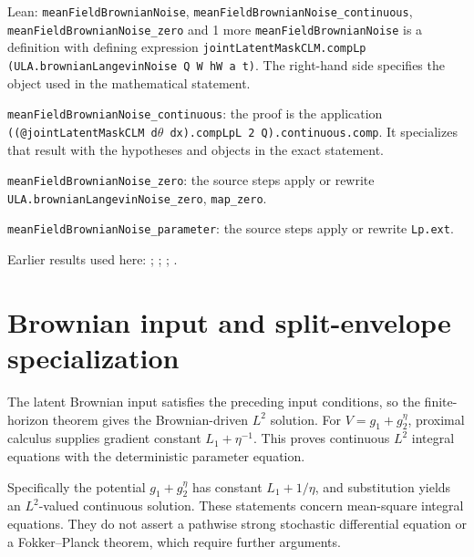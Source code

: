 \documentclass[11pt,a4paper]{article}
\begin{document}
\begin{leanbox}{Lean: \texttt{meanFieldBrownianNoise}, \texttt{meanFieldBrownianNoise\_\allowbreak{}continuous}, \texttt{meanFieldBrownianNoise\_\allowbreak{}zero} and 1 more}
\texttt{mean\allowbreak{}Field\allowbreak{}Brownian\allowbreak{}Noise} is a definition with defining expression \texttt{joint\allowbreak{}Latent\allowbreak{}Mask\allowbreak{}CLM.\allowbreak{}comp\allowbreak{}Lp (ULA.\allowbreak{}brownian\allowbreak{}Langevin\allowbreak{}Noise Q W h\allowbreak{}W a t)}. The right-hand side specifies the object used in the mathematical statement.



\texttt{mean\allowbreak{}Field\allowbreak{}Brownian\allowbreak{}Noise\_\allowbreak{}continuous}: the proof is the application \texttt{((@joint\allowbreak{}Latent\allowbreak{}Mask\allowbreak{}CLM d\ensuremath{\theta} dx).\allowbreak{}comp\allowbreak{}Lp\allowbreak{}L 2 Q).\allowbreak{}continuous.\allowbreak{}comp}. It specializes that result with the hypotheses and objects in the exact statement.



\texttt{mean\allowbreak{}Field\allowbreak{}Brownian\allowbreak{}Noise\_\allowbreak{}zero}: the source steps apply or rewrite \texttt{ULA.\allowbreak{}brownian\allowbreak{}Langevin\allowbreak{}Noise\_\allowbreak{}zero}, \texttt{map\_\allowbreak{}zero}.



\texttt{mean\allowbreak{}Field\allowbreak{}Brownian\allowbreak{}Noise\_\allowbreak{}parameter}: the source steps apply or rewrite \texttt{Lp.\allowbreak{}ext}.
\end{leanbox}


Earlier results used here: \cite[Section~3.25.1]{LangevinLean2026ULASC}; \cite[Section~3.25.2]{LangevinLean2026ULASC}; \cite[Section~3.25.3]{LangevinLean2026ULASC}; \cite[Section~3.1.1]{LangevinLean2026IPLA}.

\section{\texorpdfstring{Brownian input and split-envelope specialization}{Brownian input and split-envelope specialization}}


The latent Brownian input satisfies the preceding input conditions, so the finite-horizon theorem gives the Brownian-driven \(L^2\) solution. For \(V=g_1+g_2^\eta\), proximal calculus supplies gradient constant \(L_1+\eta^{-1}\). This proves continuous \(L^2\) integral equations with the deterministic parameter equation.



Specifically the potential \(g_1+g_2^\eta\) has constant \(L_1+1/\eta\), and substitution yields an \(L^2\)-valued continuous solution. These statements concern mean-square integral equations. They do not assert a pathwise strong stochastic differential equation or a Fokker–Planck theorem, which require further arguments.
\end{document}
